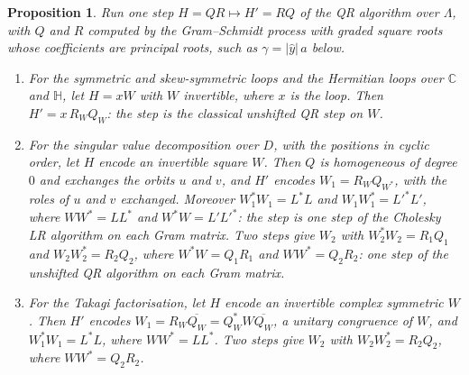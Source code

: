 \documentclass[12pt, a4paper]{report}
\theoremstyle{plain}
\newtheorem{proposition}[theorem]{Proposition}
\theoremstyle{definition}
\theoremstyle{remark}
\theoremstyle{plain}
\newcommand{\CC}{\mathbb{C}}
\newcommand{\HH}{\mathbb{H}}
\begin{document}
\begin{proposition}\label{prop:qr-steps}
Run one step $H=QR\mapsto H'=RQ$ of the QR algorithm over $\Lambda$, with $Q$ and $R$ computed by the Gram--Schmidt process with graded square roots whose coefficients are principal roots, such as $\gamma=|\hat y|\,a$ below.
\begin{enumerate}
  \item For the symmetric and skew-symmetric loops and the Hermitian loops over $\CC$ and $\HH$, let $H=xW$ with $W$ invertible, where $x$ is the loop. Then $H'=x\,R_WQ_W$: the step is the classical unshifted QR step on $W$.
  \item For the singular value decomposition over $D$, with the positions in cyclic order, let $H$ encode an invertible square $W$. Then $Q$ is homogeneous of degree $0$ and exchanges the orbits $u$ and $v$, and $H'$ encodes $W_1=R_WQ_{W^*}$, with the roles of $u$ and $v$ exchanged. Moreover $W_1^*W_1=L^*L$ and $W_1W_1^*=L'^*L'$, where $WW^*=LL^*$ and $W^*W=L'L'^*$: the step is one step of the Cholesky LR algorithm on each Gram matrix. Two steps give $W_2$ with $W_2^*W_2=R_1Q_1$ and $W_2W_2^*=R_2Q_2$, where $W^*W=Q_1R_1$ and $WW^*=Q_2R_2$: one step of the unshifted QR algorithm on each Gram matrix.
  \item For the Takagi factorisation, let $H$ encode an invertible complex symmetric $W$. Then $H'$ encodes $W_1=R_W\overline{Q_W}=Q_W^*W\overline{Q_W}$, a unitary congruence of $W$, and $W_1^*W_1=L^*L$, where $WW^*=LL^*$. Two steps give $W_2$ with $W_2W_2^*=R_2Q_2$, where $WW^*=Q_2R_2$.
\end{enumerate}
\end{proposition}
\end{document}
